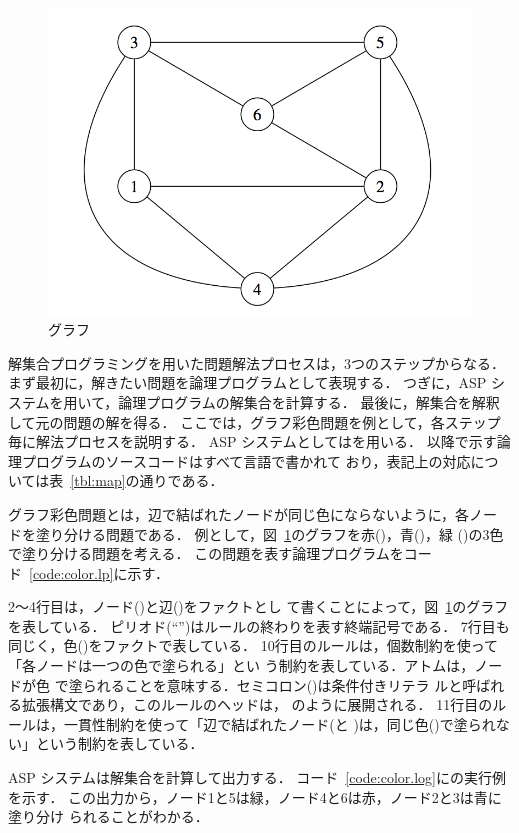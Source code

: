 \begin{figure}[tb]
  \centering
  \includegraphics[width=0.6\linewidth]{fig/graph.png}
  \caption{グラフ}
  \label{fig:graph}
\end{figure}


解集合プログラミングを用いた問題解法プロセスは，3つのステップからなる．
まず最初に，解きたい問題を論理プログラムとして表現する．
つぎに，ASP システムを用いて，論理プログラムの解集合を計算する．
最後に，解集合を解釈して元の問題の解を得る．
%
ここでは，グラフ彩色問題を例として，各ステップ毎に解法プロセスを説明する．
ASP システムとしては{\clingo}を用いる．
以降で示す論理プログラムのソースコードはすべて{\gringo}言語で書かれて
おり，表記上の対応については表~\ref{tbl:map}の通りである．

グラフ彩色問題とは，辺で結ばれたノードが同じ色にならないように，各ノー
ドを塗り分ける問題である．
例として，図~\ref{fig:graph}のグラフを赤()，青()，緑
()の3色で塗り分ける問題を考える．
この問題を表す論理プログラムをコード~\ref{code:color.lp}に示す．

2〜4行目は，ノード()と辺()をファクトとし
て書くことによって，図~\ref{fig:graph}のグラフを表している．
ピリオド(``'')はルールの終わりを表す終端記号である．
7行目も同じく，色()をファクトで表している．
%
10行目のルールは，個数制約を使って「各ノードは一つの色で塗られる」とい
う制約を表している．アトムは，ノードが色
で塗られることを意味する．セミコロン(\code{:})は条件付きリテラ
ルと呼ばれる拡張構文であり，このルールのヘッドは，
のように展開される．
11行目のルールは，一貫性制約を使って「辺で結ばれたノード(と
)は，同じ色()で塗られない」という制約を表している．

ASP システムは解集合を計算して出力する．
コード~\ref{code:color.log}に{\clingo}の実行例を示す．
この出力から，ノード1と5は緑，ノード4と6は赤，ノード2と3は青に塗り分け
られることがわかる．

